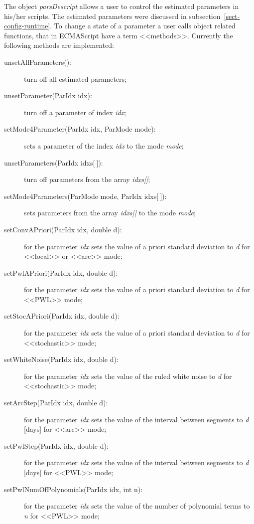 \documentclass [10pt,letterpaper]{report}
\begin{document}
The object {\sl parsDescript} allows a user to control the estimated parameters in his/her scripts.
The estimated parameters were discussed in subsection~\ref{sect-config-runtime}. To change a state
of a parameter a user calls object related functions, that in ECMAScript have a term <<methods>>.
Currently the following methods are implemented:
\begin{description}
\item[unsetAllParameters():] turn off all estimated parameters;
\item[unsetParameter(ParIdx idx):] turn off a parameter of index {\it idx};
\item[setMode4Parameter(ParIdx idx, ParMode mode):] sets a parameter of the index {\it idx} to the mode {\it mode};
\item[unsetParameters(ParIdx idxs$\lbrack\ \rbrack$):] turn off parameters from the array {\it idxs[]};
\item[setMode4Parameters(ParMode mode, ParIdx idxs$\lbrack\ \rbrack$):] sets parameters from the array {\it idxs[]} to the mode {\it mode};
\item[setConvAPriori(ParIdx idx, double d):] for the parameter {\it idx} sets the value of a priori standard deviation to {\it d}
for <<local>> or <<arc>> mode;
\item[setPwlAPriori(ParIdx idx, double d):] for the parameter {\it idx} sets the value of a priori standard deviation to {\it d}
for <<PWL>> mode;
\item[setStocAPriori(ParIdx idx, double d):] for the parameter {\it idx} sets the value of a priori standard deviation to {\it d}
for <<stochastic>> mode;
\item[setWhiteNoise(ParIdx idx, double d):] for the parameter {\it idx} sets the value of the ruled white noise to {\it d}
for <<stochastic>> mode;
\item[setArcStep(ParIdx idx, double d):] for the parameter {\it idx} sets the value of the interval between segments to {\it d} [days]
for <<arc>> mode;
\item[setPwlStep(ParIdx idx, double d):] for the parameter {\it idx} sets the value of the interval between segments to {\it d} [days]
for <<PWL>> mode;
\item[setPwlNumOfPolynomials(ParIdx idx, int n):] for the parameter {\it idx} sets the value of the number of polynomial terms to {\it n}
for <<PWL>> mode;
\end{description}
\end{document}

